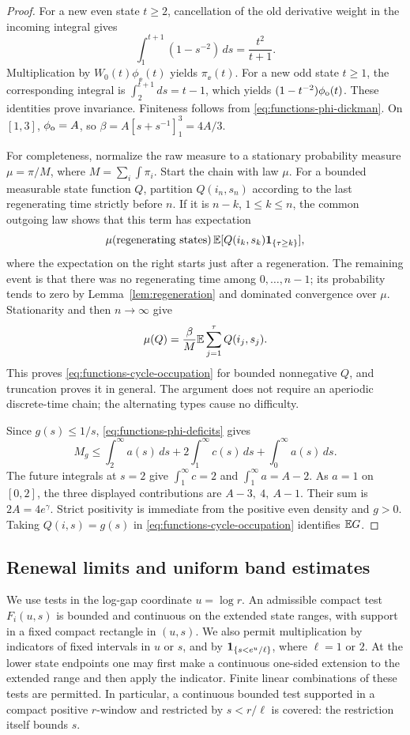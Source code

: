 \begin{proof}
For a new even state \(t\ge2\), cancellation of the old derivative
weight in the incoming integral gives
\[
 \int_1^{t+1}(1-s^{-2})\,ds=\frac{t^2}{t+1}.
\]
Multiplication by \(W_0(t)\phi_\ee(t)\) yields \(\pi_\ee(t)\).
For a new odd state \(t\ge1\), the corresponding integral is
\(\int_2^{t+1}ds=t-1\), which yields
\((1-t^{-2})\phi_\mathrm o(t)\).  These identities prove invariance.
Finiteness follows from \eqref{eq:functions-phi-dickman}.
On \([1,3]\), \(\phi_\mathrm o=A\), so
\(\beta=A[s+s^{-1}]_1^3=4A/3\).

For completeness, normalize the raw measure to a stationary
probability measure \(\mu=\pi/M\), where
\(M=\sum_i\int\pi_i\).
Start the chain with law \(\mu\).
For a bounded measurable state function \(Q\), partition \(Q(i_n,s_n)\)
according to the last regenerating time strictly before \(n\).
If it is \(n-k\), \(1\le k\le n\), the common outgoing law shows
that this term has expectation
\[
 \mu(\text{regenerating states})\,
 \mathbb E[Q(i_k,s_k)\mathbf 1_{\{\tau\ge k\}}],
\]
where the expectation on the right starts just after a regeneration.
The remaining event is that there was no regenerating time among
\(0,\ldots,n-1\); its probability tends to zero by
Lemma~\ref{lem:regeneration} and dominated convergence over \(\mu\).
Stationarity and then \(n\to\infty\) give
\[
 \mu(Q)=\frac{\beta}{M}
       \mathbb E\sum_{j=1}^{\tau}Q(i_j,s_j).
\]
This proves \eqref{eq:functions-cycle-occupation} for bounded
nonnegative \(Q\), and truncation proves it in general.
The argument does not require an aperiodic discrete-time chain;
the alternating types cause no difficulty.

Since \(g(s)\le1/s\), \eqref{eq:functions-phi-deficits} gives
\[
 M_g\le
 \int_2^\infty a(s)\,ds+
 2\int_1^\infty c(s)\,ds+
 \int_0^\infty a(s)\,ds.
\]
The future integrals at \(s=2\) give
\(\int_1^\infty c=2\) and \(\int_1^\infty a=A-2\).
As \(a=1\) on \([0,2]\), the three displayed contributions are
\(A-3,\ 4,\ A-1\).  Their sum is \(2A=4e^\gamma\).
Strict positivity is immediate from the positive even density and
\(g>0\).  Taking \(Q(i,s)=g(s)\) in
\eqref{eq:functions-cycle-occupation} identifies \(\mathbb E G\).
\end{proof}

\subsection{Renewal limits and uniform band estimates}

We use tests in the log-gap coordinate \(u=\log r\).
An admissible compact test \(F_i(u,s)\) is bounded and continuous on
the extended state ranges, with support in a fixed compact rectangle
in \((u,s)\).  We also permit multiplication by indicators of fixed
intervals in \(u\) or \(s\), and by
\(\mathbf 1_{\{s<e^u/\ell\}}\), where \(\ell=1\) or \(2\).
At the lower state endpoints one may first make a continuous
one-sided extension to the extended range and then apply the
indicator.  Finite linear combinations of these tests are permitted.
In particular, a continuous bounded test supported in a compact
positive \(r\)-window and restricted by \(s<r/\ell\) is covered:
the restriction itself bounds \(s\).

